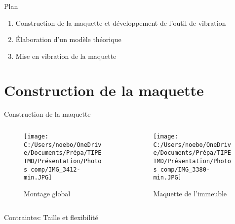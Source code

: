 \documentclass{beamer}
\begin{document}
	\begin{frame}{Plan}
		\begin{enumerate}
			\item\huge{Construction de la maquette et développement de l'outil de vibration} \linebreak
			\item Élaboration d'un modèle théorique \linebreak
			\item Mise en vibration de la maquette
 
		\end{enumerate}
	\end{frame}
	
	\section{Construction de la maquette}
	\begin{frame}{Construction de la maquette}
		\begin{columns}
			\begin{column}{0.5\textwidth}
				\begin{figure}
					\texttt{[image: C:/Users/noebo/OneDrive/Documents/Prépa/TIPE TMD/Présentation/Photos comp/IMG\_3412-min.JPG]}
					\caption{Montage global}
				\end{figure}
			
			\end{column}
			\begin{column}{0.5\textwidth}
			
			\begin{figure}
				\texttt{[image: C:/Users/noebo/OneDrive/Documents/Prépa/TIPE TMD/Présentation/Photos comp/IMG\_3380-min.JPG]}
				\caption{Maquette de l'immeuble}
			\end{figure}
			\end{column}
	
	\end{columns}
\centering	Contraintes: Taille et flexibilité


	\end{frame}
\end{document}
